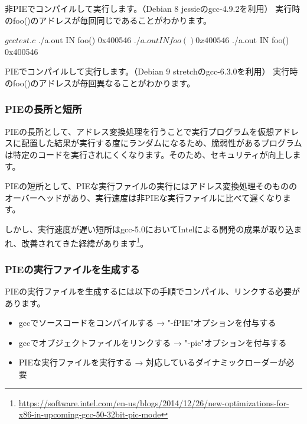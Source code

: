 \documentclass[mingoth,a4paper]{jsarticle}
\begin{document}
非PIEでコンパイルして実行します。（Debian 8 jessieのgcc-4.9.2を利用）
実行時のfoo()のアドレスが毎回同じであることがわかります。

\begin{commandline}
  $ gcc test.c
  $ ./a.out
  IN foo()
  0x400546
  $ ./a.out
  IN foo()
  0x400546
  $ ./a.out
  IN foo()
  0x400546
\end{commandline}

PIEでコンパイルして実行します。（Debian 9 stretchのgcc-6.3.0を利用）
実行時のfoo()のアドレスが毎回異なることがわかります。



\subsubsection{PIEの長所と短所}

PIEの長所として、アドレス変換処理を行うことで実行プログラムを仮想アドレスに配置した結果が実行する度にランダムになるため、脆弱性があるプログラムは特定のコードを実行されにくくなります。そのため、セキュリティが向上します。


PIEの短所として、PIEな実行ファイルの実行にはアドレス変換処理そのもののオーバーヘッドがあり、実行速度は非PIEな実行ファイルに比べて遅くなります。


しかし、実行速度が遅い短所はgcc-5.0においてIntelによる開発の成果が取り込まれ、改善されてきた経緯があります\footnote{\url{https://software.intel.com/en-us/blogs/2014/12/26/new-optimizations-for-x86-in-upcoming-gcc-50-32bit-pic-mode}}。


\subsubsection{PIEの実行ファイルを生成する}

PIEの実行ファイルを生成するには以下の手順でコンパイル、リンクする必要があります。

\begin{itemize}
\item gccでソースコードをコンパイルする → "-fPIE"オプションを付与する
\item gccでオブジェクトファイルをリンクする → "-pie"オプションを付与する
\item PIEな実行ファイルを実行する → 対応しているダイナミックローダーが必要
\end{itemize}
\end{document}
